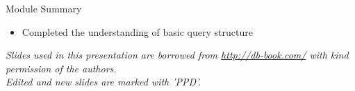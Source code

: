 \documentclass[aspectratio=169, xcolor=dvipsnames]{beamer}
\begin{document}
\begin{frame}{Module Summary}
    \begin{itemize}
        \item Completed the understanding of basic query structure
    \end{itemize}
    \vspace{2em}
    \begin{center}
    \small \textit{Slides used in this presentation are borrowed from \url{http://db-book.com/} with kind permission of the authors.} \\
    \small \textit{Edited and new slides are marked with 'PPD'.}
    \end{center}
\end{frame}
\end{document}
